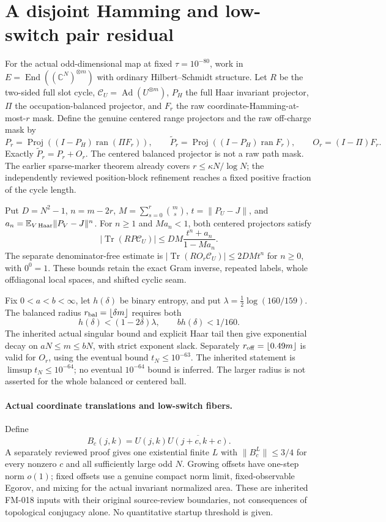 \section{A disjoint Hamming and low-switch pair residual}
\label{sec:hamming-low-switch-residual}

For the actual odd-dimensional map at fixed $\tau=10^{-80}$, work in
$E=\operatorname{End}((\mathbb C^N)^{\otimes m})$ with ordinary
Hilbert--Schmidt structure. Let $R$ be the two-sided full slot cycle,
$\mathcal C_U=\operatorname{Ad}(U^{\otimes m})$, $P_H$ the full Haar invariant
projector, $\Pi$ the occupation-balanced projector, and $F_r$ the raw
coordinate-Hamming-at-most-$r$ mask. Define the genuine centered range
projectors and the raw off-charge mask by
\[
 P_r=\operatorname{Proj}((I-P_H)\operatorname{ran}(\Pi F_r)),\qquad
 \widetilde P_r=\operatorname{Proj}((I-P_H)\operatorname{ran}F_r),\qquad
 O_r=(I-\Pi)F_r.
\]
Exactly $\widetilde P_r=P_r+O_r$. The centered balanced projector is not a
raw path mask. The earlier sparse-marker theorem already covers
$r\le\kappa N/\log N$; the independently reviewed position-block refinement
reaches a fixed positive fraction of the cycle length.

Put $D=N^2-1$, $n=m-2r$, $M=\sum_{s=0}^r\binom ms$,
$t=\|P_U-J\|$, and $a_n=\mathbb E_{V\,{\rm Haar}}\|P_V-J\|^n$.
For $n\ge1$ and $Ma_n<1$, both centered projectors satisfy
\[
 |\operatorname{Tr}(RP\mathcal C_U)|
 \le DM\frac{t^n+a_n}{1-Ma_n}.
\]
The separate denominator-free estimate is
$|\operatorname{Tr}(RO_r\mathcal C_U)|\le2DMt^n$ for $n\ge0$,
with $0^0=1$. These bounds retain the exact Gram inverse, repeated labels,
whole offdiagonal local spaces, and shifted cyclic seam.

Fix $0<a<b<\infty$, let $h(\delta)$ be binary entropy, and put
$\lambda=\frac12\log(160/159)$. The balanced radius
$r_{\rm bal}=\lfloor\delta m\rfloor$ requires both
\[
 h(\delta)<(1-2\delta)\lambda,\qquad b h(\delta)<1/160.
\]
The inherited actual singular bound and explicit Haar tail then give
exponential decay on $aN\le m\le bN$, with strict exponent slack.
Separately $r_{\rm off}=\lfloor0.49m\rfloor$ is valid for $O_r$, using the
eventual bound $t_N\le10^{-63}$. The inherited statement is
$\limsup t_N\le10^{-64}$; no eventual $10^{-64}$ bound is inferred.
The larger radius is not asserted for the whole balanced or centered ball.

\paragraph{Actual coordinate translations and low-switch fibers.}
Define
\[
 B_c(j,k)=U(j,k)\overline{U(j+c,k+c)}.
\]
A separately reviewed proof gives
one existential finite $L$ with $\|B_c^L\|\le3/4$ for every nonzero $c$ and
all sufficiently large odd $N$. Growing offsets have one-step norm $o(1)$;
fixed offsets use a genuine compact norm limit, fixed-observable Egorov,
and mixing for the actual invariant normalized area. These are inherited
FM-018 inputs with their original source-review boundaries, not consequences
of topological conjugacy alone. No quantitative startup threshold is given.


